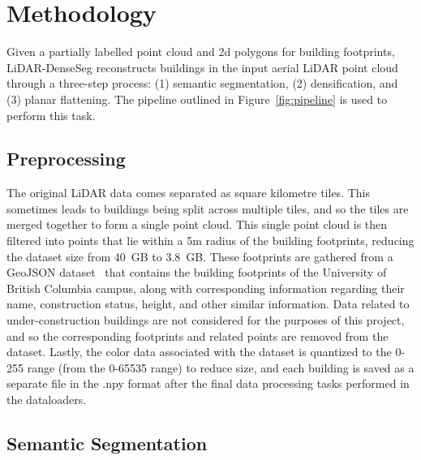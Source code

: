 \documentclass[10pt,twocolumn,letterpaper]{article}
\begin{document}
    \section{Methodology}\label{sec:methodology}

    Given a partially labelled point cloud and 2d polygons for building footprints, LiDAR-DenseSeg reconstructs buildings in the input aerial LiDAR point cloud through a three-step process: (1) semantic segmentation, (2) densification, and (3) planar flattening.
    The pipeline outlined in Figure~\ref{fig:pipeline} is used to perform this task.

    

    \subsection{Preprocessing}\label{subsec:preprocessing}

    The original LiDAR data comes separated as square kilometre tiles.
    This sometimes leads to buildings being split across multiple tiles, and so the tiles are merged together to form a single point cloud.
    This single point cloud is then filtered into points that lie within a 5m radius of the building footprints, reducing the dataset size from 40~GB to 3.8~GB\@.
    These footprints are gathered from a GeoJSON dataset~\cite{ubcgeospatial} that contains the building footprints of the University of British Columbia campus, along with corresponding information regarding their name, construction status, height, and other similar information.
    Data related to under-construction buildings are not considered for the purposes of this project, and so the corresponding footprints and related points are removed from the dataset.
    Lastly, the color data associated with the dataset is quantized to the 0-255 range (from the 0-65535 range) to reduce size, and each building is saved as a separate file in the .npy format after the final data processing tasks performed in the dataloaders.

    \subsection{Semantic Segmentation}\label{subsec:semantic-segmentation}
\end{document}
